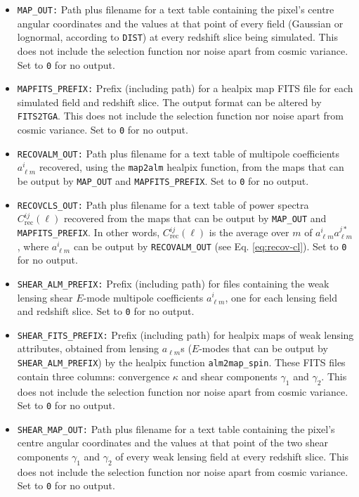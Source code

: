 \documentclass[12pt]{book} %
\newcommand{\nv}[1]{\mathrm{#1}}                 %
\begin{document}
\begin{itemize}
\item {\tt MAP\_OUT:} Path plus filename for a text table containing the pixel's centre angular 
  coordinates and the values at that point of every field (Gaussian or lognormal, according to 
  {\tt DIST}) at every redshift slice being simulated. This does not include the selection function 
  nor noise apart from cosmic variance. Set to {\tt 0} for no output. 

\item {\tt MAPFITS\_PREFIX:} Prefix (including path) for a {\sc healpix} map FITS file for each 
  simulated field and redshift slice. The output format can be altered by {\tt FITS2TGA}. This does not include 
  the selection function nor noise apart from cosmic variance. Set to {\tt 0} for no output. 
  
\item {\tt RECOVALM\_OUT:} Path plus filename for a text table of multipole coefficients 
  $a^{i}_{\ell m}$ recovered, using the {\tt map2alm} {\sc healpix} function, 
  from the maps that can be output by {\tt MAP\_OUT} and 
  {\tt MAPFITS\_PREFIX}. Set to {\tt 0} for no output. 

\item {\tt RECOVCLS\_OUT:} Path plus filename for a text table of power spectra 
  $C_{\nv{rec}}^{ij}(\ell)$ recovered from the maps that can be output by {\tt MAP\_OUT} and 
  {\tt MAPFITS\_PREFIX}. In other words, $C_{\nv{rec}}^{ij}(\ell)$ is the average over $m$ 
  of $a^{i}_{\ell m}a^{j*}_{\ell m}$, where $a^{i}_{\ell m}$ can be output by {\tt RECOVALM\_OUT} (see Eq. \ref{eq:recov-cl}). 
  Set to {\tt 0} for no output. 

\item {\tt SHEAR\_ALM\_PREFIX:} Prefix (including path) for files containing the weak lensing 
  shear $E$-mode multipole coefficients $a^{i}_{\ell m}$, one for each lensing field and redshift 
  slice. Set to {\tt 0} for no output. 

\item {\tt SHEAR\_FITS\_PREFIX:} Prefix (including path) for {\sc healpix} maps 
  of weak lensing attributes, obtained from lensing $a_{\ell m}$s ($E$-modes that can be 
  output by {\tt SHEAR\_ALM\_PREFIX}) by the {\sc healpix} function {\tt alm2map\_spin}. 
  These FITS files contain three columns: convergence $\kappa$ and shear components 
  $\gamma_1$ and $\gamma_2$. This does not include the selection function nor noise apart 
  from cosmic variance. Set to {\tt 0} for no output. 

\item {\tt SHEAR\_MAP\_OUT:} Path plus filename for a text table containing the pixel's 
  centre angular coordinates and the values at that point of the two shear components  
  $\gamma_1$ and $\gamma_2$ of every weak lensing field at every redshift slice. 
  This does not include the selection function nor noise apart from cosmic variance. 
  Set to {\tt 0} for no output. 


\end{itemize}
\end{document}
